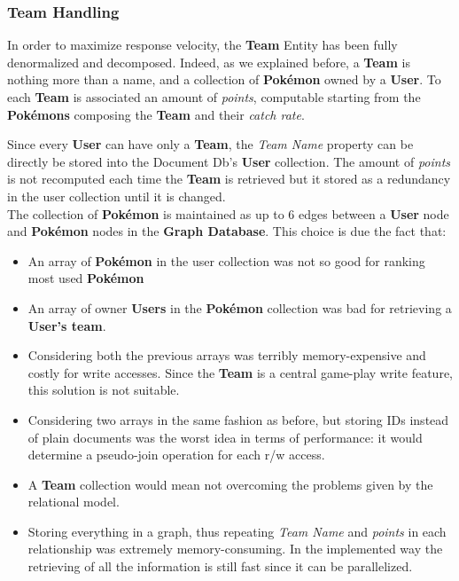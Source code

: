 \subsubsection{Team Handling}
In order to maximize response velocity, the \textbf{Team} Entity has been fully denormalized and decomposed. Indeed, as we explained before, a \textbf{Team} is nothing more than a name, and a collection of \textbf{Pokémon} owned by a \textbf{User}. To each \textbf{Team} is associated an amount of \textit{points}, computable starting from the \textbf{Pokémons} composing the \textbf{Team} and their \textit{catch rate}.

Since every \textbf{User} can have only a \textbf{Team}, the \textit{Team Name} property can be directly be stored into the Document Db’s \textbf{User} collection. 
The amount of \textit{points} is not recomputed each time the \textbf{Team} is retrieved but it stored as a redundancy in the user collection until it is changed. \\
The collection of \textbf{Pokémon} is maintained as up to 6 edges between a \textbf{User} node and \textbf{Pokémon} nodes in the \textbf{Graph Database}. \colorbox{BurntOrange}{This choice is due the fact that}:
\begin{itemize}
	\item An array of \textbf{Pokémon} in the user collection was not so good for ranking most used \textbf{Pokémon}
	\item An array of owner \textbf{Users} in the \textbf{Pokémon} collection was bad for retrieving a \textbf{User’s team}.
	\item Considering both the previous arrays was terribly memory-expensive and costly for write accesses. Since the \textbf{Team} is a central game-play write feature, this solution is not suitable.
	\item Considering two arrays in the same fashion as before, but storing IDs instead of plain documents was the worst idea in terms of performance: it would determine a pseudo-join operation for each r/w access.
	\item A \textbf{Team} collection would mean not overcoming the problems given by the relational model. 
	\item Storing everything in a graph, thus repeating \textit{Team Name} and \textit{points} in each relationship was extremely memory-consuming. In the implemented way the retrieving of all the information is still fast since it can be parallelized.
\end{itemize}

